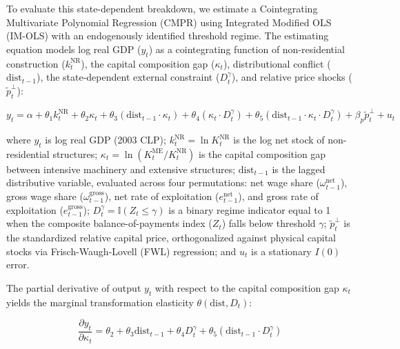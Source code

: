 To evaluate this state-dependent breakdown, we estimate a Cointegrating Multivariate Polynomial Regression (CMPR) using Integrated Modified OLS (IM-OLS) \citep{VogelsangWagner2024} with an endogenously identified threshold regime. The estimating equation models log real GDP ($y_t$) as a cointegrating function of non-residential construction ($k_t^{\text{NR}}$), the capital composition gap ($\kappa_t$), distributional conflict ($\text{dist}_{t-1}$), the state-dependent external constraint ($D_t^{\gamma}$), and relative price shocks ($\tilde{p}_t^\perp$):

\begin{equation}
	y_t = \alpha + \theta_1 k_t^{\text{NR}} + \theta_2 \kappa_t + \theta_3 (\text{dist}_{t-1} \cdot \kappa_t) + \theta_4 (\kappa_t \cdot D_t^{\gamma}) + \theta_5 (\text{dist}_{t-1} \cdot \kappa_t \cdot D_t^{\gamma}) + \beta_p \tilde{p}_t^\perp + u_t
\end{equation}

where $y_t$ is log real GDP (2003 CLP); $k_t^{\text{NR}} = \ln K_t^{\text{NR}}$ is the log net stock of non-residential structures; $\kappa_t = \ln(K_t^{\text{ME}} / K_t^{\text{NR}})$ is the capital composition gap between intensive machinery and extensive structures; $\text{dist}_{t-1}$ is the lagged distributive variable, evaluated across four permutations: net wage share ($\omega_{t-1}^{\text{net}}$), gross wage share ($\omega_{t-1}^{\text{gross}}$), net rate of exploitation ($e_{t-1}^{\text{net}}$), and gross rate of exploitation ($e_{t-1}^{\text{gross}}$); $D_t^{\gamma} = \mathbb{I}(Z_t \le \gamma)$ is a binary regime indicator equal to 1 when the composite balance-of-payments index ($Z_t$) falls below threshold $\gamma$; $\tilde{p}_t^\perp$ is the standardized relative capital price, orthogonalized against physical capital stocks via Frisch-Waugh-Lovell (FWL) regression; and $u_t$ is a stationary $I(0)$ error.

The partial derivative of output $y_t$ with respect to the capital composition gap $\kappa_t$ yields the marginal transformation elasticity $\theta(\text{dist}, D_t)$:

\begin{equation}
	\frac{\partial y_t}{\partial \kappa_t} = \theta_2 + \theta_3 \text{dist}_{t-1} + \theta_4 D_t^{\gamma} + \theta_5 (\text{dist}_{t-1} \cdot D_t^{\gamma})
\end{equation}

